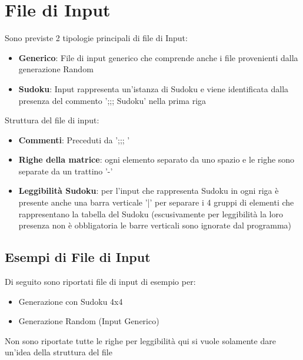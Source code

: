 \chapter{File di Input}
Sono previste 2 tipologie principali di file di Input:
\begin{itemize}
    \item \textbf{Generico}: File di input generico che comprende anche i file provenienti dalla generazione Random
    \item \textbf{Sudoku}: Input rappresenta un'istanza di Sudoku e viene identificata dalla presenza del commento ';;; Sudoku' nella prima riga
\end{itemize}
Struttura del file di input:
\begin{itemize}
    \item \textbf{Commenti}: Preceduti da ';;; '
    \item \textbf{Righe della matrice}: ogni elemento separato da uno spazio e le righe sono separate da un trattino '-'
    \item \textbf{Leggibilità Sudoku}: per l'input che rappresenta Sudoku in ogni riga è presente anche una barra verticale '|' per separare i 4 gruppi di elementi che rappresentano la tabella del Sudoku (escusivamente per leggibilità la loro presenza non è obbligatoria le barre verticali sono ignorate dal programma)
\end{itemize}
\vfill
\section{Esempi di File di Input}
Di seguito sono riportati file di input di esempio per:
\begin{itemize}
    \item Generazione con Sudoku 4x4
    \item Generazione Random (Input Generico)
\end{itemize}
Non sono riportate tutte le righe per leggibilità qui si vuole solamente dare un'idea della struttura del file
\newpage
